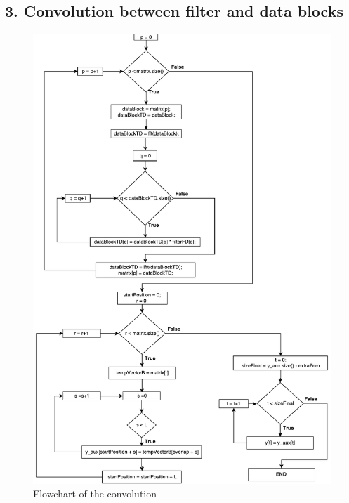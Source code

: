 \subsection*{3. Convolution between filter and data blocks}
\begin{figure}[h]
	\centering
	\includegraphics[width=13cm]{./algorithms/overlap_save/figures/convolution_part2.pdf}
	\caption{Flowchart of the convolution}
	\label{convolution_part2}
\end{figure}


\newpage
